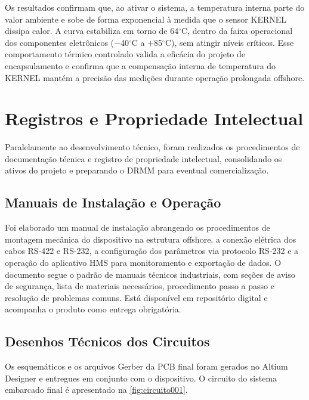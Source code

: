 \documentclass[a4paper, 12pt]{article}
\begin{document}
    Os resultados confirmam que, ao ativar o sistema, a temperatura interna parte do valor ambiente e sobe de forma exponencial à medida que o sensor KERNEL dissipa calor. A curva estabiliza em torno de 64$^\circ$C, dentro da faixa operacional dos componentes eletrônicos ($-$40$^\circ$C a $+$85$^\circ$C), sem atingir níveis críticos. Esse comportamento térmico controlado valida a eficácia do projeto de encapsulamento e confirma que a compensação interna de temperatura do KERNEL mantém a precisão das medições durante operação prolongada offshore.


\newpage
\section{Registros e Propriedade Intelectual}

Paralelamente ao desenvolvimento técnico, foram realizados os procedimentos de documentação técnica e registro de propriedade intelectual, consolidando os ativos do projeto e preparando o DRMM para eventual comercialização.

\subsection{Manuais de Instalação e Operação}

    Foi elaborado um manual de instalação abrangendo os procedimentos de montagem mecânica do dispositivo na estrutura offshore, a conexão elétrica dos cabos RS-422 e RS-232, a configuração dos parâmetros via protocolo RS-232 e a operação do aplicativo HMS para monitoramento e exportação de dados. O documento segue o padrão de manuais técnicos industriais, com seções de aviso de segurança, lista de materiais necessários, procedimento passo a passo e resolução de problemas comuns. Está disponível em repositório digital e acompanha o produto como entrega obrigatória.

\subsection{Desenhos Técnicos dos Circuitos}

    Os esquemáticos e os arquivos Gerber da PCB final foram gerados no Altium Designer e entregues em conjunto com o dispositivo. O circuito do sistema embarcado final é apresentado na \autoref{fig:circuito001}.
\end{document}

